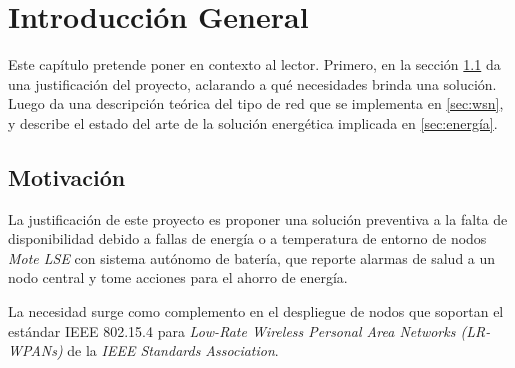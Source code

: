 
\chapter{Introducción General} %

\label{Chapter1} %
\label{IntroGeneral}


\newcommand{\keyword}[1]{\textbf{#1}}
\newcommand{\tabhead}[1]{\textbf{#1}}
\newcommand{\code}[1]{\texttt{#1}}
\newcommand{\file}[1]{\texttt{\bfseries#1}}
\newcommand{\option}[1]{\texttt{\itshape#1}}
\newcommand{\grados}{$^{\circ}$}


Este capítulo pretende poner en contexto al lector. Primero, en la sección \ref{sec:Motivación} da una justificación del proyecto, aclarando a qué necesidades brinda una solución. Luego da una descripción teórica del tipo de red que se implementa en \ref{sec:wsn}, y describe el estado del arte de la solución energética implicada en \ref{sec:energía}.

\section{Motivación}
\label{sec:Motivación}

La justificación de este proyecto es proponer una solución preventiva a la falta de disponibilidad debido a fallas de energía o a temperatura de entorno de nodos \textit{Mote LSE} con sistema autónomo de batería, que reporte alarmas de salud a un nodo central y tome acciones para el ahorro de energía.

La necesidad surge como complemento en el despliegue de nodos que soportan el estándar IEEE 802.15.4 \citep{802.15.4} para \textit{Low-Rate Wireless Personal Area Networks (LR-WPANs)} de la \textit{IEEE Standards Association}.

